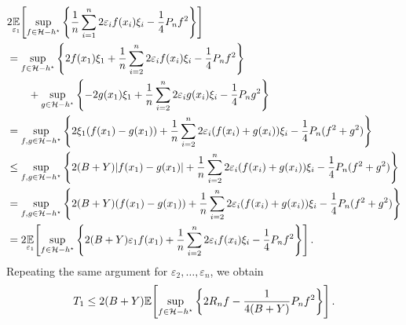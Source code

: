 \documentclass[main.tex]{subfiles}
\begin{document}
\begin{align*}
  &2\underset{{\varepsilon_{1}}}{\mathbb{E}}\!\left[{
      \sup_{f \in \mathcal{H} - h^{\star}}
      \left\{
        \frac{1}{n}\sum_{i=1}^{n}
          2\varepsilon_{i}f(x_{i})\xi_{i}
          - \frac{1}{4}P_{n}f^{2}
      \right\}
  }\right] \\
  &=
      \sup_{f \in \mathcal{H} - h^{\star}}
      \left\{
        2f(x_{1})\xi_{1} + \frac{1}{n}\sum_{i=2}^{n}
          2\varepsilon_{i}f(x_{i})\xi_{i}
          - \frac{1}{4}P_{n}f^{2}
      \right\} \\
  &\qquad+
      \sup_{g \in \mathcal{H} - h^{\star}}
      \left\{
        -2g(x_{1})\xi_{1} + \frac{1}{n}\sum_{i=2}^{n}
          2\varepsilon_{i}g(x_{i})\xi_{i}
          - \frac{1}{4}P_{n}g^{2}
      \right\} \\
  &=
      \sup_{f,g \in \mathcal{H} - h^{\star}}
      \left\{
        2\xi_{1}(f(x_{1}) - g(x_{1}))
        + \frac{1}{n}\sum_{i=2}^{n}
          2\varepsilon_{i}(f(x_{i}) + g(x_{i}))\xi_{i}
          - \frac{1}{4}P_{n}(f^{2} + g^{2})
      \right\} \\
  &\leq
      \sup_{f,g \in \mathcal{H} - h^{\star}}
      \left\{
        2(B + Y)\lvert f(x_{1}) - g(x_{1}) \rvert
        + \frac{1}{n}\sum_{i=2}^{n}
          2\varepsilon_{i}(f(x_{i}) + g(x_{i}))\xi_{i}
          - \frac{1}{4}P_{n}(f^{2} + g^{2})
      \right\} \\
  &=
      \sup_{f,g \in \mathcal{H} - h^{\star}}
      \left\{
        2(B + Y)(f(x_{1}) - g(x_{1}))
        + \frac{1}{n}\sum_{i=2}^{n}
          2\varepsilon_{i}(f(x_{i}) + g(x_{i}))\xi_{i}
          - \frac{1}{4}P_{n}(f^{2} + g^{2})
      \right\} \\
  &= 2\underset{{\varepsilon_{1}}}{\mathbb{E}}\!\left[{
      \sup_{f \in \mathcal{H} - h^{\star}}
      \left\{
        2(B + Y)\varepsilon_{1}f(x_{1})
        + \frac{1}{n}\sum_{i=2}^{n}
          2\varepsilon_{i}f(x_{i})\xi_{i}
          - \frac{1}{4}P_{n}f^{2}
      \right\}
    }\right].
\end{align*}
Repeating the same argument for $\varepsilon_{2}, \dots, \varepsilon_{n}$,
we obtain
\begin{align}
  \label{eq:t1-bound}
  T_{1} \leq 2(B+Y)
  \mathbb{E}\!\left[{\sup_{f \in \mathcal{H} - h^{\star}}
      \left\{
        2R_{n}f - \frac{1}{4(B+Y)}P_{n}f^{2}
      \right\}
  }\right].
\end{align}


\end{document}
